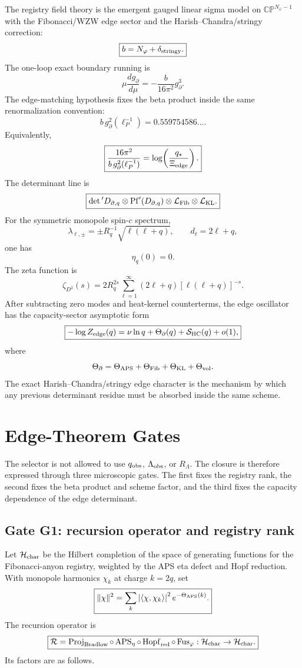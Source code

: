 \documentclass[aps,prd,reprint,nofootinbib,superscriptaddress,floatfix]{revtex4-2}
\numberwithin{equation}{section}
\theoremstyle{definition}
\theoremstyle{plain}
\begin{document}
The registry field theory is the emergent gauged linear sigma model on
\(\mathbb{CP}^{N_\varphi-1}\) with the Fibonacci/WZW edge sector and the
Harish--Chandra/stringy correction:
\[
\boxed{
b
=
N_\varphi+\delta_{\rm stringy}.
}
\]
The one-loop exact boundary running is
\[
\boxed{
\mu\frac{dg_\partial}{d\mu}
=
-\frac{b}{16\pi^2}g_\partial^3.
}
\]
The edge-matching hypothesis fixes the beta product inside the same
renormalization convention:
\[
\boxed{
b\,g_\partial^2(\ell_P^{-1})
=
0.559754586\ldots .
}
\]
Equivalently,
\[
\boxed{
\frac{16\pi^2}{b\,g_\partial^2(\ell_P^{-1})}
=
\log\!\left(\frac{q_\star}{\Xi_{\rm edge}}\right).
}
\]
The determinant line is
\[
\boxed{
\det{}'D_{\partial,q}
\otimes
{\rm Pf}'(D_{\partial,q})
\otimes
\mathcal L_{\rm Fib}
\otimes
\mathcal L_{\rm KL}.
}
\]
For the symmetric monopole spin-\(c\) spectrum,
\[
\lambda_{\ell,\pm}
=
\pm R_q^{-1}\sqrt{\ell(\ell+q)},\qquad
d_\ell=2\ell+q,
\]
one has
\[
\boxed{\eta_q(0)=0.}
\]
The zeta function is
\[
\zeta_{D^2}(s)
=
2R_q^{2s}
\sum_{\ell=1}^{\infty}
(2\ell+q)[\ell(\ell+q)]^{-s}.
\]
After subtracting zero modes and heat-kernel counterterms, the edge oscillator
has the capacity-sector asymptotic form
\[
\boxed{
-\log Z_{\rm edge}(q)
=
\nu\ln q+\Theta_{\partial}(q)
+\mathcal S_{\rm HC}(q)+o(1),
}
\]
where
\[
\Theta_{\partial}
=
\Theta_{\rm APS}
+
\Theta_{\rm Fib}
+
\Theta_{\rm KL}
+
\Theta_{\rm vol}.
\]
The exact Harish--Chandra/stringy edge character is the mechanism by which any
previous determinant residue must be absorbed inside the same scheme.


\section{Edge-Theorem Gates}
\label{sec:edge-theorem-gates}

The selector is not allowed to use \(q_{\rm obs}\), \(\Lambda_{\rm obs}\), or
\(R_\Lambda\).  The closure is therefore expressed through three microscopic
gates.  The first fixes the registry rank, the second fixes the beta product
and scheme factor, and the third fixes the capacity dependence of the edge
determinant.

\subsection{Gate G1: recursion operator and registry rank}

Let \(\mathcal H_{\rm char}\) be the Hilbert completion of the space of
generating functions for the Fibonacci-anyon registry, weighted by the
APS eta defect and Hopf reduction.  With monopole harmonics \(\chi_k\) at
charge \(k=2q\), set
\[
\boxed{
\|\chi\|^2
=
\sum_k
\left|\langle \chi,\chi_k\rangle\right|^2
e^{-\Theta_{\rm APS}(k)}.
}
\]
The recursion operator is
\[
\boxed{
\mathcal R
=
\operatorname{Proj}_{\rm Bradlow}
\circ
\operatorname{APS}_{\eta}
\circ
\operatorname{Hopf}_{\rm red}
\circ
\operatorname{Fus}_{\varphi}
:
\mathcal H_{\rm char}\to\mathcal H_{\rm char}.
}
\]
Its factors are as follows.
\end{document}
